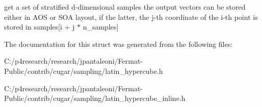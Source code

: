 get a set of stratified d-\/dimensional samples the output vectors can be stored either in A\+OS or S\+OA layout, if the latter, the j-\/th coordinate of the i-\/th point is stored in samples\mbox{[}i + j $\ast$ n\+\_\+samples\mbox{]} 

The documentation for this struct was generated from the following files\+:\begin{DoxyCompactItemize}
\item 
C\+:/p4research/research/jpantaleoni/\+Fermat-\/\+Public/contrib/cugar/sampling/latin\+\_\+hypercube.\+h\item 
C\+:/p4research/research/jpantaleoni/\+Fermat-\/\+Public/contrib/cugar/sampling/latin\+\_\+hypercube\+\_\+inline.\+h\end{DoxyCompactItemize}
